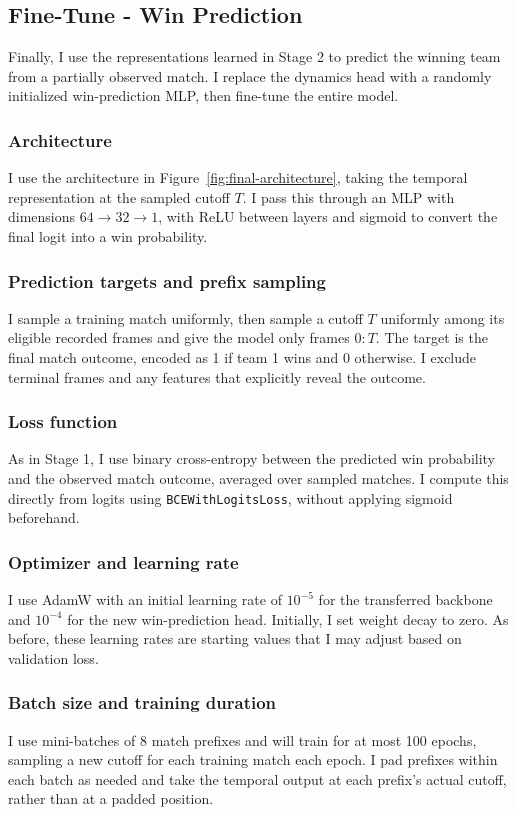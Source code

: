 \documentclass[11pt]{article}
\begin{document}
\subsection{Fine-Tune - Win Prediction}
    Finally, I use the representations learned in Stage 2 to predict the winning team from a partially observed match. I replace the dynamics head with a randomly initialized win-prediction MLP, then fine-tune the entire model.

    \subsubsection{Architecture}
        I use the architecture in Figure~\ref{fig:final-architecture}, taking the temporal representation at the sampled cutoff $T$. I pass this through an MLP with dimensions $64\rightarrow32\rightarrow1$, with ReLU between layers and sigmoid to convert the final logit into a win probability.

    \subsubsection{Prediction targets and prefix sampling}
        I sample a training match uniformly, then sample a cutoff $T$ uniformly among its eligible recorded frames and give the model only frames $0{:}T$. The target is the final match outcome, encoded as 1 if team 1 wins and 0 otherwise. I exclude terminal frames and any features that explicitly reveal the outcome.

    \subsubsection{Loss function}
        As in Stage 1, I use binary cross-entropy between the predicted win probability and the observed match outcome, averaged over sampled matches. I compute this directly from logits using \texttt{BCEWithLogitsLoss}, without applying sigmoid beforehand.

    \subsubsection{Optimizer and learning rate}
        I use AdamW with an initial learning rate of $10^{-5}$ for the transferred backbone and $10^{-4}$ for the new win-prediction head. Initially, I set weight decay to zero. As before, these learning rates are starting values that I may adjust based on validation loss.

    \subsubsection{Batch size and training duration}
        I use mini-batches of 8 match prefixes and will train for at most 100 epochs, sampling a new cutoff for each training match each epoch. I pad prefixes within each batch as needed and take the temporal output at each prefix's actual cutoff, rather than at a padded position.
\end{document}
